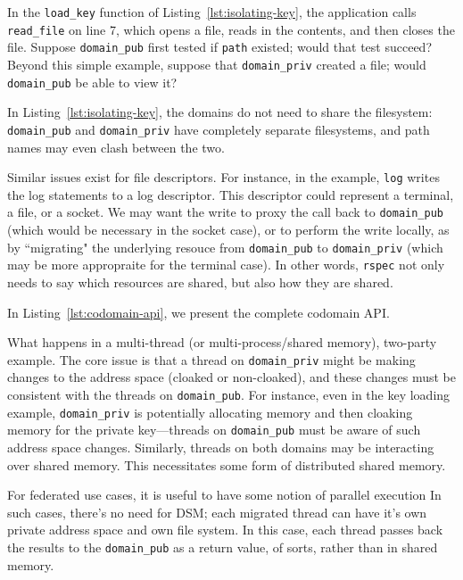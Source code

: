 %
In the \texttt{load\_key} function of Listing~\ref{lst:isolating-key}, the
application calls \texttt{read\_file} on line 7,
which opens a file, reads in the contents, and then closes the file.
%
Suppose \texttt{domain\_pub} first tested if \texttt{path} existed;
would that test succeed?  
%
Beyond this simple example, suppose that \texttt{domain\_priv} created a
file; would \texttt{domain\_pub} be able to view it? 
%


%
In Listing~\ref{lst:isolating-key}, the domains do not need to share the filesystem:
\texttt{domain\_pub} and \texttt{domain\_priv} have completely separate
filesystems, and path names may even clash between the two.



Similar issues exist for file descriptors.
%
For instance, in the example, \texttt{log} writes the log statements to a log
descriptor.
%
This descriptor could represent a terminal, a file, or a socket.
%
We may want the write to proxy the call back to \texttt{domain\_pub} (which
would be necessary in the socket case), or to perform the write locally, as by
``migrating" the underlying resouce from \texttt{domain\_pub} to
\texttt{domain\_priv} (which may be more appropraite for the terminal case).
%
In other words, \texttt{rspec} not only needs to say which resources
are shared, but also how they are shared.


In Listing~\ref{lst:codomain-api}, we present the complete codomain API\@.


%
What happens in a multi-thread (or multi-process/shared memory), two-party
example.  
%
The core issue is that a thread on \texttt{domain\_priv} might be making changes to
the address space (cloaked or non-cloaked), and these changes must be
consistent with the threads on \texttt{domain\_pub}.
%
For instance, even in the key loading example, \texttt{domain\_priv} is
potentially allocating memory and then cloaking memory for the private
key---threads on \texttt{domain\_pub} must be aware of such address space
changes.
%
Similarly, threads on both domains may be interacting over shared memory.
%
This necessitates some form of distributed shared memory.



%
%
For federated use cases, it is useful to have some notion of parallel
execution
%
In such cases, there's no need for DSM; each migrated thread can have it's own
private address space and own file system.
%
In this case, each thread passes back the results to the \texttt{domain\_pub}
as a return value, of sorts, rather than in shared memory.


